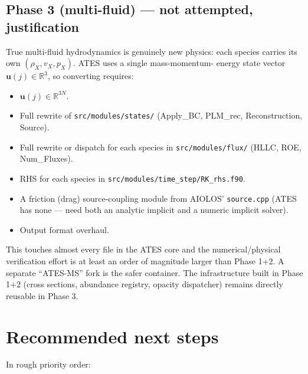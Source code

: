 \documentclass[english,a4paper]{my_memo}
\begin{document}
\subsection{Phase 3 (multi-fluid) --- not attempted, justification}

True multi-fluid hydrodynamics is genuinely new physics: each species
carries its own $(\rho_X, v_X, p_X)$. ATES uses a single mass-momentum-
energy state vector $\mathbf{u}(j) \in \mathbb{R}^3$, so converting requires:
\begin{itemize}
\item $\mathbf{u}(j) \in \mathbb{R}^{3N}$.
\item Full rewrite of \texttt{src/modules/states/} (Apply\_BC, PLM\_rec,
Reconstruction, Source).
\item Full rewrite or dispatch for each species in \texttt{src/modules/flux/}
(HLLC, ROE, Num\_Fluxes).
\item RHS for each species in \texttt{src/modules/time\_step/RK\_rhs.f90}.
\item A friction (drag) source-coupling module from
AIOLOS' \texttt{source.cpp} (ATES has none --- need both an analytic
implicit and a numeric implicit solver).
\item Output format overhaul.
\end{itemize}

This touches almost every file in the ATES core and the numerical/physical
verification effort is at least an order of magnitude larger than Phase 1+2.
A separate ``ATES-MS'' fork is the safer container. The infrastructure
built in Phase 1+2 (cross sections, abundance registry, opacity dispatcher)
remains directly reusable in Phase 3.

\section{Recommended next steps}

In rough priority order:
\end{document}
